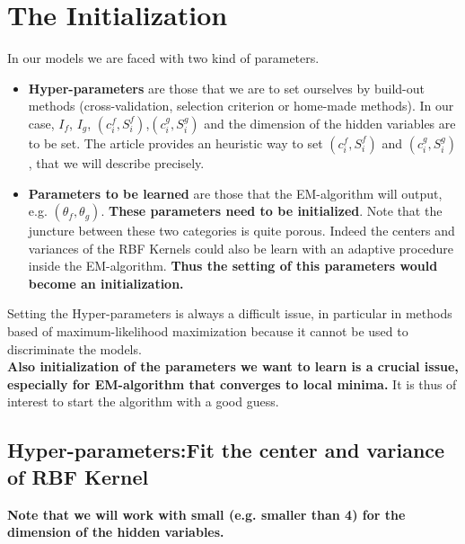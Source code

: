 \section{The Initialization}

In our models we are faced with two kind of parameters. 
\begin{itemize}
\item \textbf{Hyper-parameters} are those that we are to set ourselves by build-out methods (cross-validation, selection criterion or home-made methods). In our case, $I_f$, $I_g$, $(c_i^f,S_i^f)$,$(c_i^g,S_i^g)$ and the dimension of the hidden variables are to be set. The article provides an heuristic way to set $(c_i^f,S_i^f)$ and $(c_i^g,S_i^g)$, that we will describe precisely.
\item \textbf{Parameters to be learned} are those that the EM-algorithm will output, e.g. $(\theta_f,\theta_g)$. \textbf{These parameters need to be initialized}. Note that the juncture between these two categories is quite porous. Indeed the centers and variances of the RBF Kernels could also be learn with an adaptive procedure inside the EM-algorithm. \textbf{Thus the setting of this parameters would become an initialization.}
\end{itemize}
Setting the Hyper-parameters is always a difficult issue, in particular in methods based of maximum-likelihood maximization because it cannot be used to discriminate the models.\\

\textbf{Also initialization of the parameters we want to learn is a crucial issue, especially for EM-algorithm that converges to local minima.} It is thus of interest to  start the algorithm with a good guess.\\



\subsection{Hyper-parameters:Fit the center and variance of RBF Kernel}
\textbf{Note that we will work with small (e.g. smaller than 4) for the dimension of the hidden variables.}\\



